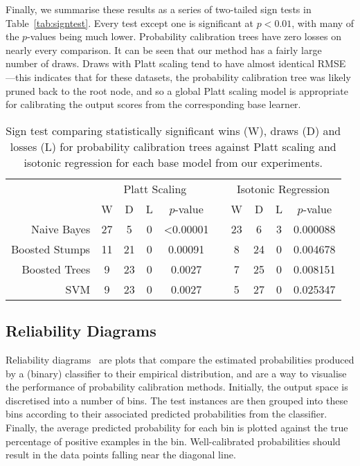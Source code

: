 \documentclass[wcp]{jmlr}
\begin{document}
Finally, we summarise these results as a series of two-tailed sign tests in Table~\ref{tab:signtest}. Every test except one is significant at $p < 0.01$, with many of the $p$-values being much lower. Probability calibration trees have zero losses on nearly every comparison. It can be seen that our method has a fairly large number of draws. Draws with Platt scaling tend to have almost identical RMSE---this indicates that for these datasets, the probability calibration tree was likely pruned back to the root node, and so a global Platt scaling model is appropriate for calibrating the output scores from the corresponding base learner.  

\begin{table}[h]
\centering
\caption{\label{tab:signtest}Sign test comparing statistically significant wins (W), draws (D) and losses (L) for probability calibration trees against Platt scaling and isotonic regression for each base model from our experiments.}
\label{my-label}
\begin{tabular}{rccccccccc}
 \addlinespace[-\aboverulesep] \cmidrule[\heavyrulewidth]{2-10}
               & \multicolumn{4}{c}{Platt Scaling} & & \multicolumn{4}{c}{Isotonic Regression} \\ 
               \cmidrule{2-5} \cmidrule{7-10} 
               & W   & D   & L  & $p$-value         & & W       & D       & L     & $p$-value      \\ \midrule
Naive Bayes    & 27  & 5   & 0  & \textless0.00001  & & 23      & 6       & 3     & 0.000088     \\
Boosted Stumps & 11  & 21  & 0  & 0.00091           & & 8       & 24      & 0     & 0.004678     \\
Boosted Trees  & 9   & 23  & 0  & 0.0027            & & 7       & 25      & 0     & 0.008151     \\
SVM            & 9   & 23  & 0  & 0.0027            & & 5       & 27      & 0     & 0.025347     \\ \bottomrule
\end{tabular}
\end{table}

\subsection{Reliability Diagrams}

Reliability diagrams~\citep{degroot1983comparison} are plots that compare the estimated probabilities produced by a (binary) classifier to their empirical distribution, and are a way to visualise the performance of probability calibration methods. Initially, the output space is discretised into a number of bins. The test instances are then grouped into these bins according to their associated predicted probabilities from the classifier. Finally, the average predicted probability for each bin is plotted against the true percentage of positive examples in the bin. Well-calibrated probabilities should result in the data points falling near the diagonal line.
\end{document}
